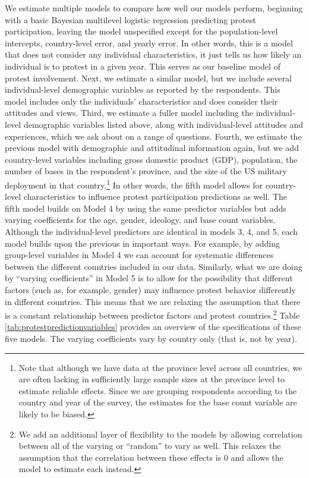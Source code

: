 			We estimate multiple models to compare how well our models perform, beginning with a basic Bayesian multilevel logistic regression predicting protest participation, leaving the model unspecified except for the population-level intercepts, country-level error, and yearly error. In other words, this is a model that does not consider any individual characteristics, it just tells us how likely an individual is to protest in a given year. This serves as our baseline model of protest involvement. Next, we estimate a similar model, but we include several individual-level demographic variables as reported by the respondents. This model includes only the individuals' characteristics and does consider their attitudes and views. Third, we estimate a fuller model including the individual-level demographic variables listed above, along with individual-level attitudes and experiences, which we ask about on a range of questions. Fourth, we estimate the previous model with demographic and attitudinal information again, but we add country-level variables including gross domestic product (GDP), population, the number of bases in the respondent's province, and the size of the US military deployment in that country.\footnote{Note that although we have data at the province level across all countries, we are often lacking in sufficiently large sample sizes at the province level to estimate reliable effects. Since we are grouping respondents according to the country and year of the survey, the estimates for the base count variable are likely to be biased.} In other words, the fifth model allows for country-level characteristics to influence protest participation predictions as well. The fifth model builds on Model 4 by using the same predictor variables but adds varying coefficients for the age, gender, ideology, and base count variables. Although the individual-level predictors are identical in models 3, 4, and 5, each model builds upon the previous in important ways. For example, by adding group-level variables in Model 4 we can account for systematic differences between the different countries included in our data. Similarly, what we are doing by ``varying coefficients'' in Model 5 is to allow for the possibility that different factors (such as, for example, gender) may influence protest behavior differently in different countries.  
			This means that we are relaxing the assumption that there is a constant relationship between predictor factors and protest countries.\footnote{We add an additional layer of flexibility to the models by allowing correlation between all of the varying or ``random'' to vary as well. This relaxes the assumption that the correlation between these effects is 0 and allows the model to estimate each instead.} Table \ref{tab:protestpredictionvariables} provides an overview of the specifications of these five models. The varying coefficients vary by country only (that is, not by year). 
			
